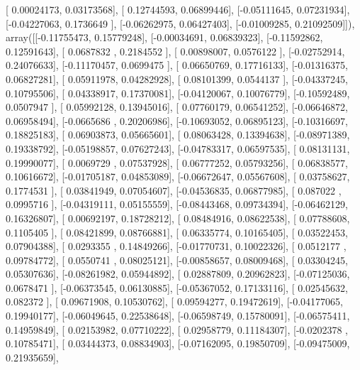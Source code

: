 \documentclass{article}
\begin{document}
       [ 0.00024173,  0.03173568],
       [ 0.12744593,  0.06899446],
       [-0.05111645,  0.07231934],
       [-0.04227063,  0.1736649 ],
       [-0.06262975,  0.06427403],
       [-0.01009285,  0.21092509]]), array([[-0.11755473,  0.15779248],
       [-0.00034691,  0.06839323],
       [-0.11592862,  0.12591643],
       [ 0.0687832 ,  0.2184552 ],
       [ 0.00898007,  0.0576122 ],
       [-0.02752914,  0.24076633],
       [-0.11170457,  0.0699475 ],
       [ 0.06650769,  0.17716133],
       [-0.01316375,  0.06827281],
       [ 0.05911978,  0.04282928],
       [ 0.08101399,  0.0544137 ],
       [-0.04337245,  0.10795506],
       [ 0.04338917,  0.17370081],
       [-0.04120067,  0.10076779],
       [-0.10592489,  0.0507947 ],
       [ 0.05992128,  0.13945016],
       [ 0.07760179,  0.06541252],
       [-0.06646872,  0.06958494],
       [-0.0665686 ,  0.20206986],
       [-0.10693052,  0.06895123],
       [-0.10316697,  0.18825183],
       [ 0.06903873,  0.05665601],
       [ 0.08063428,  0.13394638],
       [-0.08971389,  0.19338792],
       [-0.05198857,  0.07627243],
       [-0.04783317,  0.06597535],
       [ 0.08131131,  0.19990077],
       [ 0.0069729 ,  0.07537928],
       [ 0.06777252,  0.05793256],
       [ 0.06838577,  0.10616672],
       [-0.01705187,  0.04853089],
       [-0.06672647,  0.05567608],
       [ 0.03758627,  0.1774531 ],
       [ 0.03841949,  0.07054607],
       [-0.04536835,  0.06877985],
       [ 0.087022  ,  0.0995716 ],
       [-0.04319111,  0.05155559],
       [-0.08443468,  0.09734394],
       [-0.06462129,  0.16326807],
       [ 0.00692197,  0.18728212],
       [ 0.08484916,  0.08622538],
       [ 0.07788608,  0.1105405 ],
       [ 0.08421899,  0.08766881],
       [ 0.06335774,  0.10165405],
       [ 0.03522453,  0.07904388],
       [ 0.0293355 ,  0.14849266],
       [-0.01770731,  0.10022326],
       [ 0.0512177 ,  0.09784772],
       [ 0.0550741 ,  0.08025121],
       [-0.00858657,  0.08009468],
       [ 0.03304245,  0.05307636],
       [-0.08261982,  0.05944892],
       [ 0.02887809,  0.20962823],
       [-0.07125036,  0.0678471 ],
       [-0.06373545,  0.06130885],
       [-0.05367052,  0.17133116],
       [ 0.02545632,  0.082372  ],
       [ 0.09671908,  0.10530762],
       [ 0.09594277,  0.19472619],
       [-0.04177065,  0.19940177],
       [-0.06049645,  0.22538648],
       [-0.06598749,  0.15780091],
       [-0.06575411,  0.14959849],
       [ 0.02153982,  0.07710222],
       [ 0.02958779,  0.11184307],
       [-0.0202378 ,  0.10785471],
       [ 0.03444373,  0.08834903],
       [-0.07162095,  0.19850709],
       [-0.09475009,  0.21935659],
\end{document}
